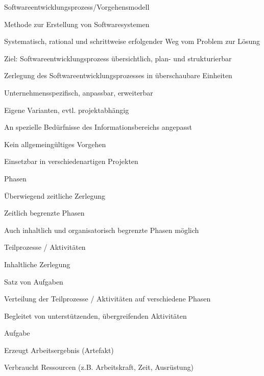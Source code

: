\documentclass[a4paper]{article}
\begin{document}
\begin{multicols}{3}
  Softwareentwicklungsprozess/Vorgehensmodell
  \begin{itemize*}
    \item Methode zur Erstellung von Softwaresystemen
    \item Systematisch, rational und schrittweise erfolgender Weg vom Problem zur Lösung
    \item Ziel: Softwareentwicklungsprozess übersichtlich, plan- und strukturierbar
    \item Zerlegung des Softwareentwicklungsprozesses in überschaubare Einheiten
    \item Unternehmensspezifisch, anpassbar, erweiterbar
    \begin{itemize*}
      \item Eigene Varianten, evtl. projektabhängig
      \item An spezielle Bedürfnisse des Informationsbereichs angepasst
      \item Kein allgemeingültiges Vorgehen
      \item Einsetzbar in verschiedenartigen Projekten
    \end{itemize*}
  \end{itemize*}

  Phasen
  \begin{itemize*}
    \item Überwiegend zeitliche Zerlegung
    \item Zeitlich begrenzte Phasen
    \item Auch inhaltlich und organisatorisch begrenzte Phasen möglich
    \item Teilprozesse / Aktivitäten
    \begin{itemize*}
      \item Inhaltliche Zerlegung
      \item Satz von Aufgaben
      \item Verteilung der Teilprozesse / Aktivitäten auf verschiedene Phasen
      \item Begleitet von unterstützenden, übergreifenden Aktivitäten
    \end{itemize*}
  \end{itemize*}

  Aufgabe
  \begin{itemize*}
    \item Erzeugt Arbeitsergebnis (Artefakt)
    \item Verbraucht Ressourcen (z.B. Arbeitskraft, Zeit, Ausrüstung)
  \end{itemize*}


\end{multicols}
\end{document}
